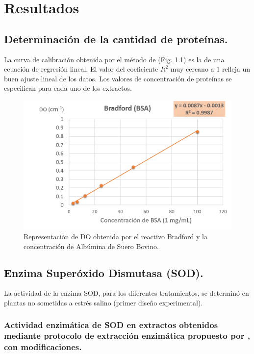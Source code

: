 
\chapter{Resultados}

\section{Determinaci\'on de la cantidad de prote\'inas.}

La curva de calibraci\'on obtenida por el m\'etodo de \cite{bradford1976rapid} (Fig. \ref{bsa}) es la de una ecuaci\'on de regresi\'on lineal. El valor del coeficiente $R^2$ muy cercano a 1 refleja un buen ajuste lineal de los datos. Los valores de concentraci\'on de prote\'inas se especifican para cada uno de los extractos.

\begin{figure}[hbtp]
	\centering
	\includegraphics[scale=0.80]{Imagenes/BSA}
	\caption{Representaci\'on de DO obtenida por el reactivo Bradford y la concentraci\'on de Alb\'umina de Suero Bovino.}
	\label{bsa}
\end{figure}

\section{Enzima Super\'oxido Dismutasa (SOD).}

La actividad de la enzima SOD, para los diferentes tratamientos, se determin\'o en plantas no sometidas a estr\'es salino (primer dise\~no experimental). 

\subsection{Actividad enzim\'atica de SOD en extractos obtenidos mediante protocolo de extracci\'on enzim\'atica propuesto por \cite{liu2010exogenous}, con modificaciones.}

